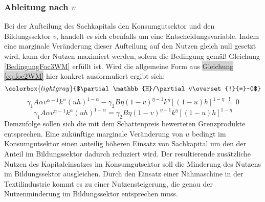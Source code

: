 \subsubsection*{Ableitung nach $v$}
Bei der Aufteilung des Sachkapitals den Konsumgutsektor und den Bildungssektor $v$, handelt es sich ebenfalls um eine Entscheidungsvariable. Indem eine marginale Veränderung dieser Aufteilung auf den Nutzen gleich null gesetzt wird, kann der Nutzen maximiert werden, sofern die Bedingung gemä{\ss} Gleichung \eqref{BedingungFoc3WM} erfüllt ist.
Wird die allgemeine Form aus \colorbox{lightgray}{Gleichung \eqref{eq:foc2WM}} hier konkret ausformuliert ergibt sich:
\begin{equation}
\colorbox{lightgray}{$\partial\mathbb{H}/\partial v\overset{!}{=}~0$}
\end{equation}
\vspace{-0.5cm}
\begin{equation}
\gamma_1A\alpha v^{\alpha-1}k^\alpha(uh)^{1-\alpha}-\gamma_2B\eta(1-v)^{\eta-1}k^\eta[(1-u)h]^{1-\eta}\overset{!}{=}~0
\end{equation}
\vspace{-0.7cm}
\begin{equation}
\gamma_1A\alpha v^{\alpha-1}k^\alpha(uh)^{1-\alpha}=\gamma_2B\eta(1-v)^{\eta-1}k^\eta[(1-u)h]^{1-\eta}
\end{equation}
Demzufolge sollen sich die mit dem Schattenpreis bewerteten Grenzprodukte entsprechen. Eine zukünftige marginale Veränderung von $u$ bedingt im Konsumgutsektor einen anteilig höheren Einsatz von Sachkapital um den der Anteil im Bildungssektor dadurch reduziert wird. Der resultierende zusätzliche Nutzen des Kapitaleinsatzes im Konsumgutsektor soll die Minderung des Nutzens im Bildungssektor ausgleichen. Durch den Einsatz einer Nähmaschine in der Textilindustrie kommt es zu einer Nutzensteigerung, die genau der Nutzenminderung im Bildungssektor entsprechen muss. 

